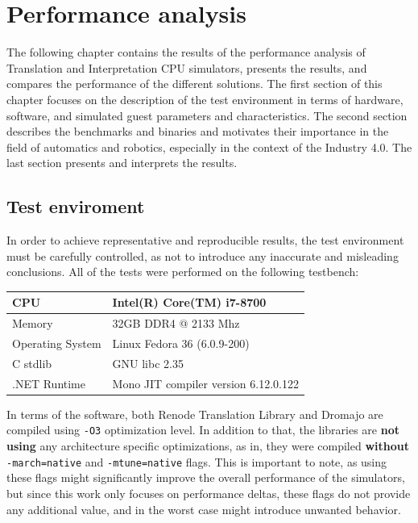 \chapter{Performance analysis}

The following chapter contains the results of the performance analysis of Translation and Interpretation CPU simulators,
presents the results, and compares the performance of the different solutions. The first section of this chapter focuses
on the description of the test environment in terms of hardware, software, and simulated guest parameters and
characteristics. The second section describes the benchmarks and binaries and motivates their importance in the field
of automatics and robotics, especially in the context of the Industry 4.0. The last section presents and interprets
the results.

\section{Test enviroment}
In order to achieve representative and reproducible results, the test environment must be carefully controlled, as not
to introduce any inaccurate and misleading conclusions. All of the tests were performed on the following testbench:

\begin{table}[h!]
    \centering
    \begin{tabular}{l|l}
    CPU              & Intel(R) Core(TM) i7-8700             \\
    \hline
    Memory           & 32GB DDR4 @ 2133 Mhz                  \\
    \hline
    Operating System & Linux Fedora 36 (6.0.9-200)           \\
    \hline
    C stdlib         & GNU libc 2.35                         \\
    \hline
    .NET Runtime     & Mono JIT compiler version 6.12.0.122
    \end{tabular}
\end{table}

\noindent
In terms of the software, both Renode Translation Library and Dromajo are compiled using \texttt{-O3} optimization
level. In addition to that, the libraries are \textbf{not using} any architecture specific optimizations, as in,
they were compiled \textbf{without} \texttt{-march=native} and \texttt{-mtune=native} flags. This is important
to note, as using these flags might significantly improve the overall performance of the simulators, but since
this work only focuses on performance deltas, these flags do not provide any additional value, and in the worst
case might introduce unwanted behavior.

